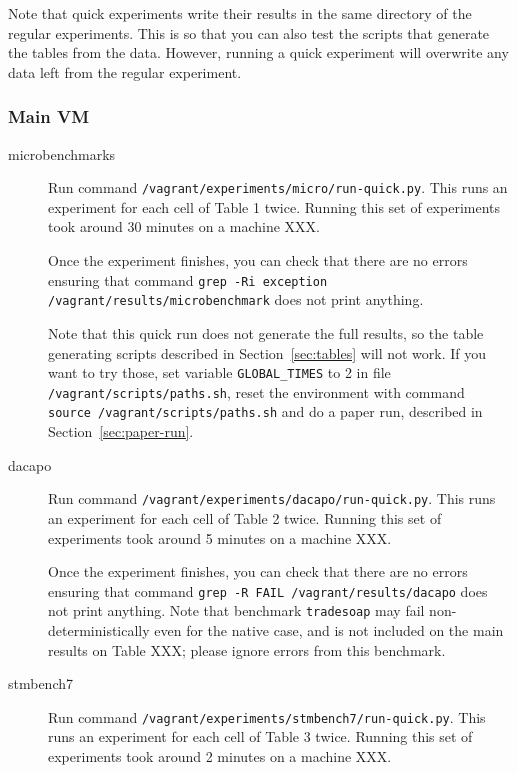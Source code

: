 \documentclass[12pt]{article}
\begin{document}
Note that quick experiments write their results in the same directory of the
regular experiments.  This is so that you can also test the scripts that
generate the tables from the data.  However, running a quick experiment will
overwrite any data left from the regular experiment.

\subsubsection{Main VM}

\begin{description}

    \item[microbenchmarks] Run command
        \texttt{/vagrant/experiments/micro/run-quick.py}.  This runs an
        experiment for each cell of Table 1 twice.  Running this set of
        experiments took around 30 minutes on a machine XXX.

        Once the experiment finishes, you can check that there are no errors
        ensuring that command \texttt{grep -Ri exception /vagrant/results/microbenchmark}
        does not print anything.

        Note that this quick run does not generate the full results, so the
        table generating scripts described in Section~\ref{sec:tables} will not
        work.  If you want to try those, set variable \texttt{GLOBAL\_TIMES} to
        2 in file \texttt{/vagrant/scripts/paths.sh}, reset the environment with
        command \texttt{source /vagrant/scripts/paths.sh} and do a paper run,
        described in Section~\ref{sec:paper-run}.

    \item[dacapo] Run command \texttt{/vagrant/experiments/dacapo/run-quick.py}.
        This runs an experiment for each cell of Table 2 twice.  Running this
        set of experiments took around 5 minutes on a machine XXX.

        Once the experiment finishes, you can check that there are no errors
        ensuring that command \texttt{grep -R FAIL /vagrant/results/dacapo} does not
        print anything.  Note that benchmark \texttt{tradesoap} may fail
        non-deterministically even for the native case, and is not included on
        the main results on Table XXX; please ignore errors from this benchmark.

    \item[stmbench7] Run command
        \texttt{/vagrant/experiments/stmbench7/run-quick.py}.  This runs an
        experiment for each cell of Table 3 twice.  Running this set of
        experiments took around 2 minutes on a machine XXX.


\end{description}
\end{document}
